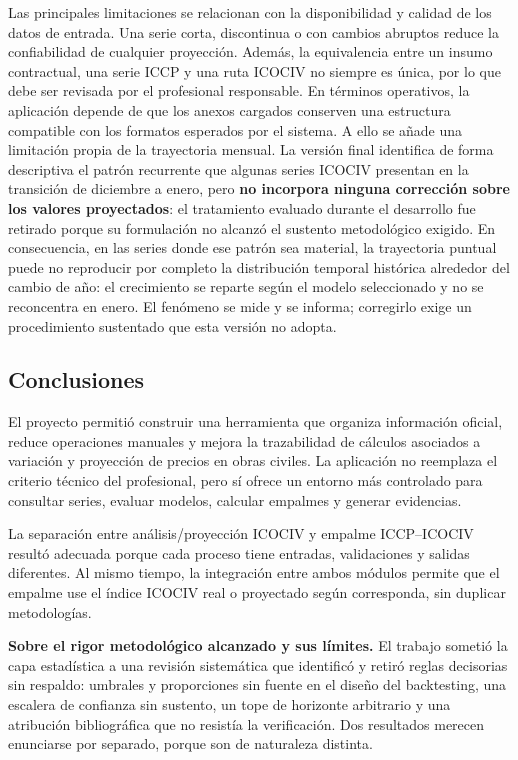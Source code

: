 \documentclass[12pt,letterpaper]{article}
\newcommand{\ICOCIV}{ICOCIV}
\newcommand{\ICCP}{ICCP}
\begin{document}
Las principales limitaciones se relacionan con la disponibilidad y calidad de los datos de entrada. Una serie corta, discontinua o con cambios abruptos reduce la confiabilidad de cualquier proyección. Además, la equivalencia entre un insumo contractual, una serie \ICCP{} y una ruta \ICOCIV{} no siempre es única, por lo que debe ser revisada por el profesional responsable. En términos operativos, la aplicación depende de que los anexos cargados conserven una estructura compatible con los formatos esperados por el sistema. A ello se añade una limitación propia de la trayectoria mensual. La versión final identifica de forma descriptiva el patrón recurrente que algunas series \ICOCIV{} presentan en la transición de diciembre a enero, pero \textbf{no incorpora ninguna corrección sobre los valores proyectados}: el tratamiento evaluado durante el desarrollo fue retirado porque su formulación no alcanzó el sustento metodológico exigido. En consecuencia, en las series donde ese patrón sea material, la trayectoria puntual puede no reproducir por completo la distribución temporal histórica alrededor del cambio de año: el crecimiento se reparte según el modelo seleccionado y no se reconcentra en enero. El fenómeno se mide y se informa; corregirlo exige un procedimiento sustentado que esta versión no adopta.

\subsection{Conclusiones}

El proyecto permitió construir una herramienta que organiza información oficial, reduce operaciones manuales y mejora la trazabilidad de cálculos asociados a variación y proyección de precios en obras civiles. La aplicación no reemplaza el criterio técnico del profesional, pero sí ofrece un entorno más controlado para consultar series, evaluar modelos, calcular empalmes y generar evidencias.

La separación entre análisis/proyección \ICOCIV{} y empalme \ICCP--\ICOCIV{} resultó adecuada porque cada proceso tiene entradas, validaciones y salidas diferentes. Al mismo tiempo, la integración entre ambos módulos permite que el empalme use el índice \ICOCIV{} real o proyectado según corresponda, sin duplicar metodologías.

\textbf{Sobre el rigor metodológico alcanzado y sus límites.} El trabajo sometió
la capa estadística a una revisión sistemática que identificó y retiró reglas
decisorias sin respaldo: umbrales y proporciones sin fuente en el diseño del
backtesting, una escalera de confianza sin sustento, un tope de horizonte
arbitrario y una atribución bibliográfica que no resistía la verificación. Dos
resultados merecen enunciarse por separado, porque son de naturaleza distinta.
\end{document}
